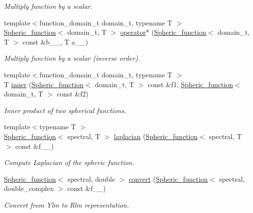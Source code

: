 \begin{DoxyCompactItemize}
\begin{DoxyCompactList}\small\item\em Multiply function by a scalar. \end{DoxyCompactList}\item 
{\footnotesize template$<$function\+\_\+domain\+\_\+t domain\+\_\+t, typename T $>$ }\\\hyperlink{classsirius_1_1_spheric__function}{Spheric\+\_\+function}$<$ domain\+\_\+t, T $>$ \hyperlink{namespacesirius_ad87044349e4626818b9d9d90e77c7a50}{operator$\ast$} (\hyperlink{classsirius_1_1_spheric__function}{Spheric\+\_\+function}$<$ domain\+\_\+t, T $>$ const \&b\+\_\+\+\_\+, T a\+\_\+\+\_\+)
\begin{DoxyCompactList}\small\item\em Multiply function by a scalar (inverse order). \end{DoxyCompactList}\item 
{\footnotesize template$<$function\+\_\+domain\+\_\+t domain\+\_\+t, typename T $>$ }\\T \hyperlink{namespacesirius_ae842905fe78e18c41bf2106f63fac510}{inner} (\hyperlink{classsirius_1_1_spheric__function}{Spheric\+\_\+function}$<$ domain\+\_\+t, T $>$ const \&f1, \hyperlink{classsirius_1_1_spheric__function}{Spheric\+\_\+function}$<$ domain\+\_\+t, T $>$ const \&f2)
\begin{DoxyCompactList}\small\item\em Inner product of two spherical functions. \end{DoxyCompactList}\item 
{\footnotesize template$<$typename T $>$ }\\\hyperlink{classsirius_1_1_spheric__function}{Spheric\+\_\+function}$<$ spectral, T $>$ \hyperlink{namespacesirius_a84accb2dc31d7144fe5b97e0b2965001}{laplacian} (\hyperlink{classsirius_1_1_spheric__function}{Spheric\+\_\+function}$<$ spectral, T $>$ const \&f\+\_\+\+\_\+)
\begin{DoxyCompactList}\small\item\em Compute Laplacian of the spheric function. \end{DoxyCompactList}\item 
\hyperlink{classsirius_1_1_spheric__function}{Spheric\+\_\+function}$<$ spectral, double $>$ \hyperlink{namespacesirius_a3ff02e3210f7940768f513fb8c3a3e05}{convert} (\hyperlink{classsirius_1_1_spheric__function}{Spheric\+\_\+function}$<$ spectral, double\+\_\+complex $>$ const \&f\+\_\+\+\_\+)
\begin{DoxyCompactList}\small\item\em Convert from Ylm to Rlm representation. \end{DoxyCompactList}\item 

\end{DoxyCompactItemize}
